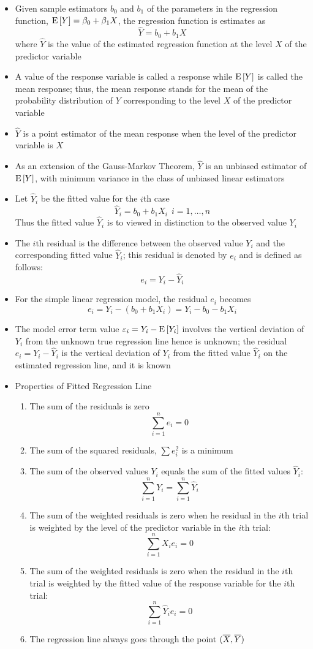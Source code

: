 \begin{itemize}
\item Given sample estimators $b_0$ and $b_1$ of the parameters in the regression function, $\mathrm{E}\left[ Y \right] = \beta_0 + \beta_1X$, the regression function is estimates as $$ \hat{Y} = b_0 + b_1X $$ where $\hat{Y}$ is the value of the estimated regression function at the level $X$ of the predictor variable 
\item A value of the response variable is called a response while $\mathrm{E}\left[ Y \right]$ is called the mean response; thus, the mean response stands for the mean of the probability distribution of $Y$ corresponding to the level $X$ of the predictor variable 
\item $\hat{Y}$ is a point estimator of the mean response when the level of the predictor variable is $X$ 
\item As an extension of the Gauss-Markov Theorem, $\hat{Y}$ is an unbiased estimator of $\mathrm{E}\left[ Y \right]$, with minimum variance in the class of unbiased linear estimators 
\item Let $\hat{Y}_i$ be the fitted value for the $i$th case $$ \hat{Y}_i = b_0 + b_1X_i ~~ i = 1,\dots,n$$ Thus the fitted value $\hat{Y}_i$ is to viewed in distinction to the observed value $Y_i$
\item The $i$th residual is the difference between the observed value $Y_i$ and the corresponding fitted value $\hat{Y}_i$; this residual is denoted by $e_i$ and is defined as follows: $$ e_i = Y_i - \hat{Y}_i $$ 
\item For the simple linear regression model, the residual $e_i$ becomes $$ e_i = Y_i - (b_0 + b_1X_i) = Y_i - b_0 - b_1X_i $$ 
\item The model error term value $\varepsilon_i = Y_i - \mathrm{E}\left[ Y_i \right]$ involves the vertical deviation of $Y_i$ from the unknown true regression line hence is unknown; the residual $e_i = Y_i - \hat{Y}_i$ is the vertical deviation of $Y_i$ from the fitted value $\hat{Y}_i$ on the estimated regression line, and it is known
\item Properties of Fitted Regression Line \begin{enumerate} 
\item The sum of the residuals is zero $$ \sum_{i=1}^n e_i = 0 $$ 
\item The sum of the squared residuals, $\sum e_i^2$ is a minimum 
\item The sum of the observed values $Y_i$ equals the sum of the fitted values $\hat{Y}_i$: $$ \sum_{i=1}^n Y_i = \sum_{i=1}^n \hat{Y}_i $$ 
\item The sum of the weighted residuals is zero when he residual in the $i$th trial is weighted by the level of the predictor variable in the $i$th trial: $$ \sum_{i=1}^n X_ie_i = 0 $$ 
\item The sum of the weighted residuals is zero when the residual in the $i$th trial is weighted by the fitted value of the response variable for the $i$th trial: $$ \sum_{i=1}^n \hat{Y}_ie_i = 0 $$ 
\item The regression line always goes through the point $(\overline{X}, \overline{Y})$ \end{enumerate} 
\end{itemize}

